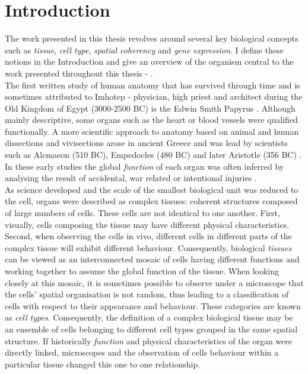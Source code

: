 %
\chapter{Introduction}\label{ch:background}
%
	
	The work presented in this thesis revolves around several key biological concepts such as \emph{tissue}, \emph{cell type}, \emph{spatial coherency} and \emph{gene expression}. I define these notions in the Introduction and give an overview of the organism central to the work presented throughout this thesis - \platyfull{}.\\
	
    The first written study of human anatomy that has survived through time and is sometimes attributed to Imhotep - physician, high priest and architect during the Old Kingdom of Egypt (3000-2500 BC) is the Edwin Smith Papyrus \cite{goodwin98,breasted30}. Although mainly descriptive, some organs such as the heart or blood vessels were qualified functionally. A more scientific approach to anatomy based on animal and human dissections and vivisections arose in ancient Greece and was lead by scientists such as Alcmaeon (510 BC),  Empedocles (480 BC) and later Aristotle (356 BC) \cite{singer57}. In these early studies the global \emph{function} of each organ was often inferred by analysing the result of accidental, war related or intentional injuries \cite{singer57}.\\ 
    
    As science developed and the scale of the smallest biological unit was reduced to the cell, organs were described as complex tissues: coherent structures composed of large numbers of cells. These cells are not identical to one another. First, visually, cells composing the tissue may have different physical characteristics. Second, when observing the cells in vivo, different cells in different parts of the complex tissue will exhibit different behaviour. Consequently, biological \emph{tissues} can be viewed as an interconnected mosaic of cells having different functions and working together to assume the global function of the tissue. When looking closely at this mosaic, it is sometimes possible to observe under a microscope \cite{young13} that the cells' spatial organisation is not random, thus leading to a classification of cells with respect to their appearance and behaviour. These categories are known as \emph{cell types}. Consequently, the definition of a complex biological tissue may be an ensemble of cells belonging to different cell types grouped in the same spatial structure.  If historically \emph{function} and physical characteristics of the organ were directly linked, microscopes and the observation of cells behaviour within a particular tissue changed this one to one relationship.\\
    
